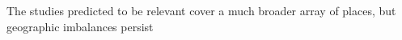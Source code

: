 \documentclass[9pt]{beamer}
\begin{document}
\begin{frame}{The studies predicted to be relevant cover a much broader array of places, but geographic imbalances persist}

\end{frame}
\end{document}
